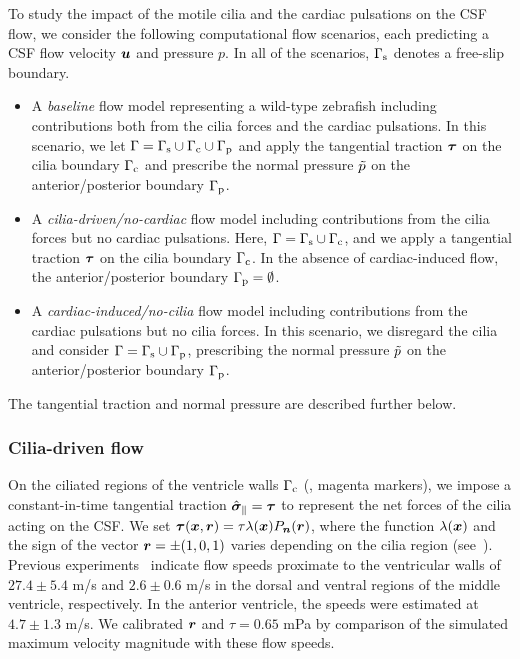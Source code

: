\documentclass{WileyMSP-template}
\begin{document}
To study the impact of the motile cilia and the cardiac pulsations on the CSF flow,
we consider the following computational flow scenarios,
each predicting a CSF flow velocity $\bm{u}$ and pressure $p$.
In all of the scenarios, $\Gamma_{\mathrm{s}}$ denotes a free-slip boundary.
\begin{itemize}
    \item A \emph{baseline} flow model representing a wild-type zebrafish including 
    contributions both from the cilia forces and the cardiac pulsations.
    In this scenario, we let $\Gamma=\Gamma_{\mathrm{s}}\cup\Gamma_{\mathrm{c}}\cup\Gamma_{\mathrm{p}}$ and apply the tangential traction $\bm{\tau}$ on the cilia boundary
    $\Gamma_{\mathrm{c}}$ and prescribe the normal pressure $\Tilde{p}$ on the anterior/posterior boundary $\Gamma_{\mathrm{p}}$. %

    \item A \emph{cilia-driven/no-cardiac} flow model including contributions from the
    cilia forces but no cardiac pulsations.
    Here, $\Gamma=\Gamma_{\mathrm{s}}\cup\Gamma_{\mathrm{c}}$, and we apply a tangential traction $\bm{\tau}$ on the cilia boundary $\Gamma_{\mathrm{c}}$.
    In the absence of cardiac-induced flow, the anterior/posterior boundary $\Gamma_{\mathrm{p}}=\emptyset$. %

    \item A \emph{cardiac-induced/no-cilia} flow model including contributions from the
    cardiac pulsations but no cilia forces.
    In this scenario, we disregard the cilia and consider $\Gamma=\Gamma_{\mathrm{s}}\cup\Gamma_{\mathrm{p}}$, prescribing the normal pressure $\Tilde{p}$ on the
    anterior/posterior boundary $\Gamma_{\mathrm{p}}$.  %
\end{itemize}
The tangential traction and normal pressure are described further below.

\subsubsection{Cilia-driven flow}
On the ciliated regions of the ventricle walls $\Gamma_{\mathrm{c}}$
(, magenta markers), we impose a
constant-in-time tangential traction $\hat{\bm{\sigma}}_{\parallel}=\bm{\tau}$ to represent the
net forces of the cilia acting on the CSF.  We set $\bm{\tau}(\bm{x}, \bm{r}) =
\tau \lambda(\bm{x}) P_{\bm{n}}(\bm{r})$, where the function $\lambda(\bm{x})$ and
the sign of the vector $\bm{r}=\pm(1, 0, 1)$ varies depending on the
cilia region (see~). Previous
experiments~\cite{Olstad2019CiliaryDevelopment} indicate flow speeds
proximate to the ventricular walls of $27.4 \pm 5.4$ \textmu m/s and
$2.6 \pm 0.6$ \textmu m/s in the dorsal and ventral regions of the
middle ventricle, respectively.  In the anterior ventricle, the speeds
were estimated at $4.7 \pm 1.3$ \textmu m/s. We calibrated $\bm{r}$ and
$\tau=0.65$ mPa by comparison of the simulated maximum velocity
magnitude with these flow speeds.
\end{document}
